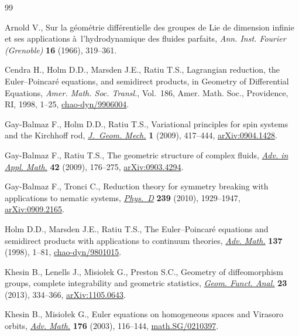 \documentclass[pdftex]{sigma}
\numberwithin{equation}{section}
\begin{document}
\begin{thebibliography}{99}
\footnotesize \itemsep=-0.5pt

Arnold V., Sur la g\'eom\'etrie dif\/f\'erentielle des groupes de {L}ie de
  dimension inf\/inie et ses applications \`a~l'hydrodynamique des f\/luides
  parfaits, \textit{Ann. Inst. Fourier (Grenoble)} \textbf{16} (1966),
  319--361.

Cendra H., Holm D.D., Marsden J.E., Ratiu T.S., Lagrangian reduction, the
  {E}uler--{P}oincar\'e equations, and semidirect products, in Geometry of
  Dif\/ferential Equations, \textit{Amer. Math. Soc. Transl.}, Vol.~186, Amer.
  Math. Soc., Providence, RI, 1998, 1--25, \href{http://arxiv.org/abs/chao-dyn/9906004}{chao-dyn/9906004}.

Gay-Balmaz F., Holm D.D., Ratiu T.S., Variational principles for spin systems
  and the {K}irchhof\/f rod, \href{http://dx.doi.org/10.3934/jgm.2009.1.417}{\textit{J.~Geom. Mech.}} \textbf{1} (2009), 417--444,
  \href{http://arxiv.org/abs/0904.1428}{arXiv:0904.1428}.

Gay-Balmaz F., Ratiu T.S., The geometric structure of complex f\/luids,
  \href{http://dx.doi.org/10.1016/j.aam.2008.06.002}{\textit{Adv. in Appl. Math.}} \textbf{42} (2009), 176--275,
  \href{http://arxiv.org/abs/0903.4294}{arXiv:0903.4294}.

Gay-Balmaz F., Tronci C., Reduction theory for symmetry breaking with
  applications to nematic systems, \href{http://dx.doi.org/10.1016/j.physd.2010.07.002}{\textit{Phys.~D}} \textbf{239} (2010),
  1929--1947, \href{http://arxiv.org/abs/0909.2165}{arXiv:0909.2165}.

Holm D.D., Marsden J.E., Ratiu T.S., The {E}uler--{P}oincar\'e equations and
  semidirect products with applications to continuum theories, \href{http://dx.doi.org/10.1006/aima.1998.1721}{\textit{Adv.
  Math.}} \textbf{137} (1998), 1--81, \href{http://arxiv.org/abs/chao-dyn/9801015}{chao-dyn/9801015}.

Khesin B., Lenells J., Misio{\l}ek G., Preston S.C., Geometry of dif\/feomorphism
  groups, complete integrability and geometric statistics, \href{http://dx.doi.org/10.1007/s00039-013-0210-2}{\textit{Geom. Funct.
  Anal.}} \textbf{23} (2013), 334--366, \href{http://arxiv.org/abs/1105.0643}{arXiv:1105.0643}.

Khesin B., Misio{\l}ek G., Euler equations on homogeneous spaces and {V}irasoro
  orbits, \href{http://dx.doi.org/10.1016/S0001-8708(02)00063-4}{\textit{Adv. Math.}} \textbf{176} (2003), 116--144,
  \href{http://arxiv.org/abs/math.SG/0210397}{math.SG/0210397}.


\end{thebibliography}
\end{document}
